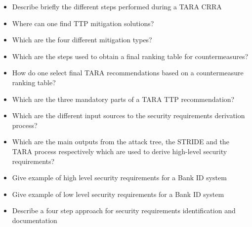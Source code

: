 \begin{itemize}
\item Describe briefly the different steps performed during a TARA CRRA
\item Where can one find TTP mitigation solutions?
\item Which are the four different mitigation types?
\item Which are the steps used to obtain a final ranking table for countermeasures?
\item How do one select final TARA recommendations based on a countermeasure ranking table?
\item Which are the three mandatory parts of a TARA TTP recommendation?
\item Which are the different input sources to the security requirements derivation process?
\item Which are the main outputs from the attack tree, the STRIDE and the TARA process respectively which are used to derive high-level security requirements?
\item Give example of high level security requirements for a Bank ID system
\item Give example of low level security requirements  for a Bank ID system
\item Describe a four step approach for security requirements identification and documentation
\end{itemize}

